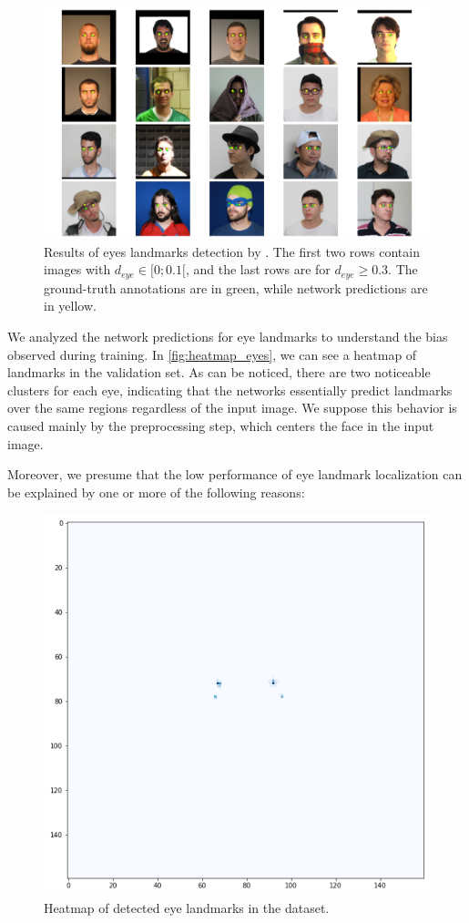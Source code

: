 \begin{figure}[htb]
\centering
\includegraphics[width=\linewidth]{images/eyes/detections.pdf}
\caption{Results of eyes landmarks detection by \methodname. The first two rows contain images with $d_{eye} \in [0;0.1[$, and the last rows are for $d_{eye} \geq 0.3$. The ground-truth annotations are in green, while network predictions are in yellow.}
\label{fig:eyes_detection}
\end{figure}
 
We analyzed the network predictions for eye landmarks to understand the bias observed during training. In \autoref{fig:heatmap_eyes}, we can see a heatmap of landmarks in the validation set. As can be noticed, there are two noticeable clusters for each eye, indicating that the networks essentially predict landmarks over the same regions regardless of the input image. We suppose this behavior is caused mainly by the preprocessing step, which centers the face in the input image.
 
Moreover, we presume that the low performance of eye landmark localization can be explained by one or more of the following reasons:
 
\begin{figure}[htb]
\centering
\includegraphics[width=0.6\linewidth]{images/eyes/heatmap_eyes_v0.914.png}
\caption{Heatmap of detected eye landmarks in the \adhoc dataset.}
\label{fig:heatmap_eyes}
\end{figure}
 
